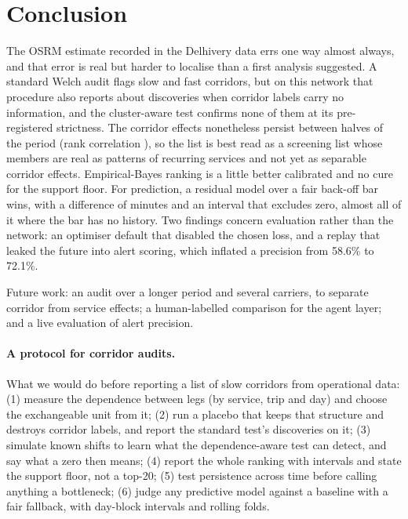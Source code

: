 \section{Conclusion}\label{sec:conclusion}

The OSRM estimate recorded in the Delhivery data errs one way almost always, and that error is real but harder to localise than a first analysis suggested. A standard Welch audit flags \fzBottlenecks{} slow and \fzFasterCorridors{} fast corridors, but on this network that procedure also reports about \fzAuditPlaceboDiscoveriesDpOne{} discoveries when corridor labels carry no information, and the cluster-aware test confirms none of them at its pre-registered strictness. The corridor effects nonetheless persist between halves of the period (rank correlation \fzStabilitySpearmanDpTwo{}), so the list is best read as a screening list whose members are real as patterns of recurring services and not yet as separable corridor effects. Empirical-Bayes ranking is a little better calibrated and no cure for the support floor. For prediction, a residual model over a fair back-off bar wins, with a difference of \fzReportedVsBarDeltaDpTwo{} minutes and an interval that excludes zero, almost all of it where the bar has no history. Two findings concern evaluation rather than the network: an optimiser default that disabled the chosen loss, and a replay that leaked the future into alert scoring, which inflated a precision from 58.6\% to 72.1\%.

Future work: an audit over a longer period and several carriers, to separate corridor from service effects; a human-labelled comparison for the agent layer; and a live evaluation of alert precision.

\paragraph{A protocol for corridor audits.} What we would do before reporting a list of slow corridors from operational data: (1) measure the dependence between legs (by service, trip and day) and choose the exchangeable unit from it; (2) run a placebo that keeps that structure and destroys corridor labels, and report the standard test's discoveries on it; (3) simulate known shifts to learn what the dependence-aware test can detect, and say what a zero then means; (4) report the whole ranking with intervals and state the support floor, not a top-20; (5) test persistence across time before calling anything a bottleneck; (6) judge any predictive model against a baseline with a fair fallback, with day-block intervals and rolling folds.


